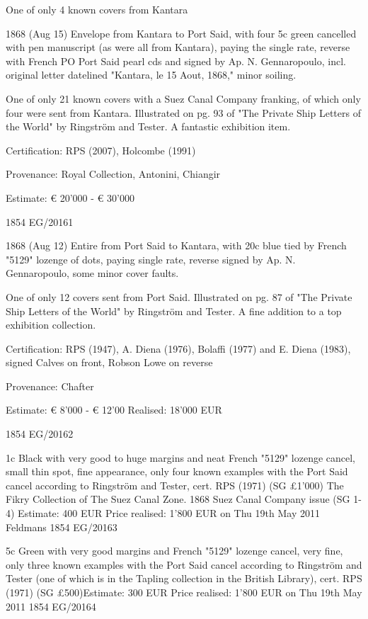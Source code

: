\documentclass[justified]{tufte-book}
\begin{document}
%
{One of only 4 known covers from Kantara

1868 (Aug 15) Envelope from Kantara to Port Said, with four 5c green cancelled with pen manuscript (as were all from Kantara), paying the single rate, reverse with French PO Port Said pearl cds and signed by Ap. N. Gennaropoulo, incl. original letter datelined "Kantara, le 15 Aout, 1868," minor soiling.

One of only 21 known covers with a Suez Canal Company franking, of which only four were sent from Kantara. Illustrated on pg. 93 of "The Private Ship Letters of the World" by Ringström and Tester. A fantastic exhibition item.

Certification: RPS (2007), Holcombe (1991)

Provenance: Royal Collection, Antonini, Chiangir

Estimate: € 20'000 - € 30'000

}
{1854}%
{EG/20161}%
{}%
{}
{}%
{}

%
{
1868 (Aug 12) Entire from Port Said to Kantara, with 20c blue tied by French "5129" lozenge of dots, paying single rate, reverse signed by Ap. N. Gennaropoulo, some minor cover faults.

One of only 12 covers sent from Port Said. Illustrated on pg. 87 of "The Private Ship Letters of the World" by Ringström and Tester. A fine addition to a top exhibition collection.

Certification: RPS (1947), A. Diena (1976), Bolaffi (1977) and E. Diena (1983), signed Calves on front, Robson Lowe on reverse

Provenance: Chafter

Estimate: € 8'000 - € 12'00
Realised:
18'000 EUR
}
{1854}%
{EG/20162}%
{}%
{}
{}%
{}


%
{1c Black with very good to huge margins and neat French "5129" lozenge cancel, small thin spot, fine appearance, only four known examples with the Port Said cancel according to Ringström and Tester, cert. RPS (1971) (SG £1'000)
The Fikry Collection of The Suez Canal Zone. 1868 Suez Canal Company issue (SG 1-4)
Estimate: 400 EUR
Price realised: 1'800 EUR on Thu 19th May 2011 Feldmans
}
{1854}%
{EG/20163}%
{}%
{}
{}%
{}


%
{5c Green with very good margins and French "5129" lozenge cancel, very fine, only three known examples with the Port Said cancel according to Ringström and Tester (one of which is in the Tapling collection in the British Library), cert. RPS (1971) (SG £500)Estimate: 300 EUR
Price realised: 1'800 EUR on Thu 19th May 2011
}
{1854}%
{EG/20164}%
{}%
{}
{}%
{}
\end{document}
